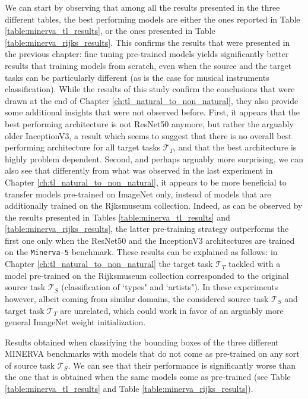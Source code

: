 We can start by observing that among all the results presented in the three different tables, the best performing models are either the ones reported in Table \ref{table:minerva_tl_results}, or the ones presented in Table \ref{table:minerva_rijks_results}. This confirms the results that were presented in the previous chapter: fine tuning pre-trained models yields significantly better results that training models from scratch, even when the source and the target tasks can be particularly different (as is the case for musical instruments classification). While the results of this study confirm the conclusions that were drawn at the end of Chapter \ref{ch:tl_natural_to_non_natural}, they also provide some additional insights that were not observed before. First, it appears that the best performing architecture is not ResNet50 anymore, but rather the arguably older InceptionV3, a result which seems to suggest that there is no overall best performing architecture for all target tasks $\mathcal{T}_T$, and that the best architecture is highly problem dependent. Second, and perhaps arguably more surprising, we can also see that differently from what was observed in the last experiment in Chapter \ref{ch:tl_natural_to_non_natural}, it appears to be more beneficial to transfer models pre-trained on ImageNet only, instead of models that are additionally trained on the Rjksmuseum collection. Indeed, as can be observed by the results presented in Tables \ref{table:minerva_tl_results} and \ref{table:minerva_rijks_results}, the latter pre-training strategy outperforms the first one only when the ResNet50 and the InceptionV3 architectures are trained on the \texttt{Minerva-5} benchmark. These results can be explained as follows: in Chapter \ref{ch:tl_natural_to_non_natural} the target task $\mathcal{T}_T$ tackled with a model pre-trained on the Rijksmuseum collection corresponded to the original source task $\mathcal{T}_S$ (classification of `types" and `artists"). In these experiments however, albeit coming from similar domains, the considered source task $\mathcal{T}_S$ and target task $\mathcal{T}_T$ are unrelated, which could work in favor of an arguably more general ImageNet weight initialization.


\begin{table}[ht!]
	\caption{Results obtained when classifying the bounding boxes of the three different MINERVA benchmarks with models that do not come as pre-trained on any sort of source task $\mathcal{T}_S$. We can see that their performance is significantly worse than the one that is obtained when the same models come as pre-trained (see Table \ref{table:minerva_tl_results} and Table \ref{table:minerva_rijks_results}).}
\resizebox{\columnwidth}{!}{%
}
\label{table:minerva_no_tl_results}
\end{table}



